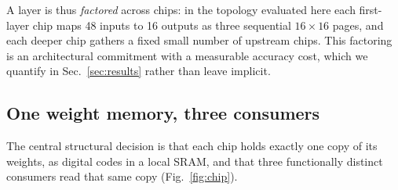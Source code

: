 \documentclass[11pt]{article}
\begin{document}
A layer is thus \emph{factored} across chips: in the topology evaluated here each first-layer chip
maps 48 inputs to 16 outputs as three sequential $16\times16$ pages, and each deeper chip gathers a
fixed small number of upstream chips. This factoring is an architectural commitment with a
measurable accuracy cost, which we quantify in Sec.~\ref{sec:results} rather than leave implicit.

\subsection{One weight memory, three consumers}\label{sec:three}

The central structural decision is that each chip holds exactly one copy of its weights, as digital
codes in a local SRAM, and that three functionally distinct consumers read that same copy
(Fig.~\ref{fig:chip}).
\end{document}

